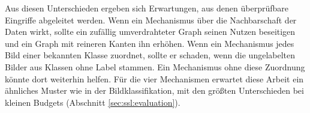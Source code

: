 Aus diesen Unterschieden ergeben sich Erwartungen, aus denen überprüfbare Eingriffe abgeleitet werden. Wenn ein Mechanismus über die Nachbarschaft der Daten wirkt, sollte ein zufällig umverdrahteter Graph seinen Nutzen beseitigen und ein Graph mit reineren Kanten ihn erhöhen. Wenn ein Mechanismus jedes Bild einer bekannten Klasse zuordnet, sollte er schaden, wenn die ungelabelten Bilder aus Klassen ohne Label stammen. Ein Mechanismus ohne diese Zuordnung könnte dort weiterhin helfen. Für die vier Mechanismen erwartet diese Arbeit ein ähnliches Muster wie in der Bildklassifikation, mit den größten Unterschieden bei kleinen Budgets (Abschnitt \ref{sec:ssl:evaluation}). 